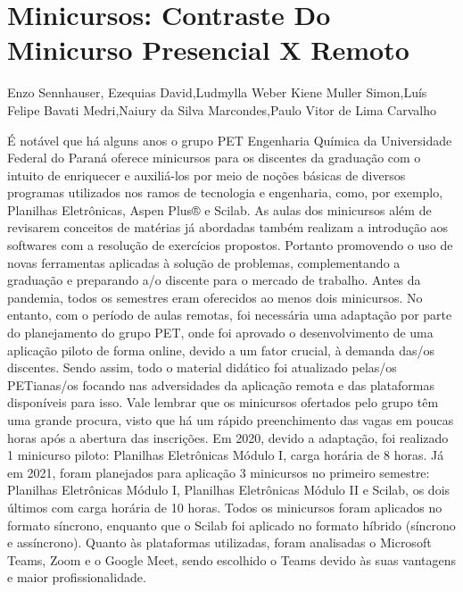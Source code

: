 


\section*{Minicursos: Contraste Do Minicurso Presencial X Remoto}

Enzo Sennhauser, Ezequias David,Ludmylla Weber Kiene Muller Simon,Luís Felipe Bavati Medri,Naiury da Silva Marcondes,Paulo Vitor de Lima Carvalho

É notável que há alguns anos o grupo PET Engenharia Química da Universidade Federal
do Paraná oferece minicursos para os discentes da graduação com o intuito de enriquecer e
auxiliá-los por meio de noções básicas de diversos programas utilizados nos ramos de tecnologia
e engenharia, como, por exemplo, Planilhas Eletrônicas, Aspen Plus® e Scilab.
As aulas dos minicursos além de revisarem conceitos de matérias já abordadas também
realizam a introdução aos softwares com a resolução de exercícios propostos. Portanto
promovendo o uso de novas ferramentas aplicadas à solução de problemas, complementando a
graduação e preparando a/o discente para o mercado de trabalho.
Antes da pandemia, todos os semestres eram oferecidos ao menos dois minicursos. No
entanto, com o período de aulas remotas, foi necessária uma adaptação por parte do
planejamento do grupo PET, onde foi aprovado o desenvolvimento de uma aplicação piloto de
forma online, devido a um fator crucial, à demanda das/os discentes.
Sendo assim, todo o material didático foi atualizado pelas/os PETianas/os focando nas
adversidades da aplicação remota e das plataformas disponíveis para isso. Vale lembrar que os
minicursos ofertados pelo grupo têm uma grande procura, visto que há um rápido preenchimento
das vagas em poucas horas após a abertura das inscrições. Em 2020, devido a adaptação, foi
realizado 1 minicurso piloto: Planilhas Eletrônicas Módulo I, carga horária de 8 horas. Já em
2021, foram planejados para aplicação 3 minicursos no primeiro semestre: Planilhas Eletrônicas
Módulo I, Planilhas Eletrônicas Módulo II e Scilab, os dois últimos com carga horária de 10
horas. Todos os minicursos foram aplicados no formato síncrono, enquanto que o Scilab foi
aplicado no formato híbrido (síncrono e assíncrono). Quanto às plataformas utilizadas, foram
analisadas o Microsoft Teams, Zoom e o Google Meet, sendo escolhido o Teams devido às suas
vantagens e maior profissionalidade.

